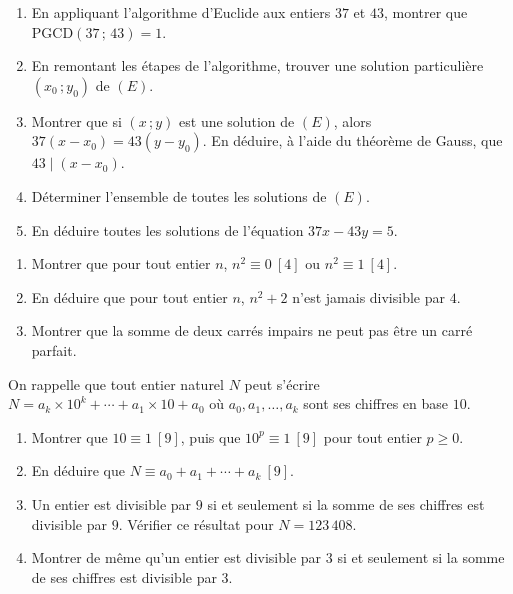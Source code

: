 \begin{enumerate}
	\item En appliquant l'algorithme d'Euclide aux entiers $37$ et $43$,
	montrer que $\mathrm{PGCD}(37\,;\,43) = 1$.

	\item En remontant les étapes de l'algorithme, trouver une solution
	particulière $(x_0\,;y_0)$ de $(E)$.

	\item Montrer que si $(x\,;y)$ est une solution de $(E)$, alors
	$37(x - x_0) = 43(y - y_0)$.
	En déduire, à l'aide du théorème de Gauss, que $43 \mid (x - x_0)$.

	\item Déterminer l'ensemble de toutes les solutions de $(E)$.

	\item En déduire toutes les solutions de l'équation $37x - 43y = 5$.
\end{enumerate}




\begin{enumerate}
	\item Montrer que pour tout entier $n$, $n^2 \equiv 0\ [4]$ ou $n^2 \equiv 1\ [4]$.
	\item En déduire que pour tout entier $n$, $n^2 + 2$ n'est jamais divisible par $4$.
	\item Montrer que la somme de deux carrés impairs ne peut pas être un carré parfait.
\end{enumerate}



On rappelle que tout entier naturel $N$ peut s'écrire
$N = a_k \times 10^k + \cdots + a_1 \times 10 + a_0$
où $a_0, a_1, \ldots, a_k$ sont ses chiffres en base $10$.

\begin{enumerate}
	\item Montrer que $10 \equiv 1\ [9]$, puis que $10^p \equiv 1\ [9]$ pour tout entier $p \geqslant 0$.
	\item En déduire que $N \equiv a_0 + a_1 + \cdots + a_k\ [9]$.
	\item Un entier est divisible par $9$ si et seulement si la somme de ses chiffres est divisible par $9$.
	Vérifier ce résultat pour $N = 123\,408$.
	\item Montrer de même qu'un entier est divisible par $3$ si et seulement si
	la somme de ses chiffres est divisible par $3$.
\end{enumerate}



